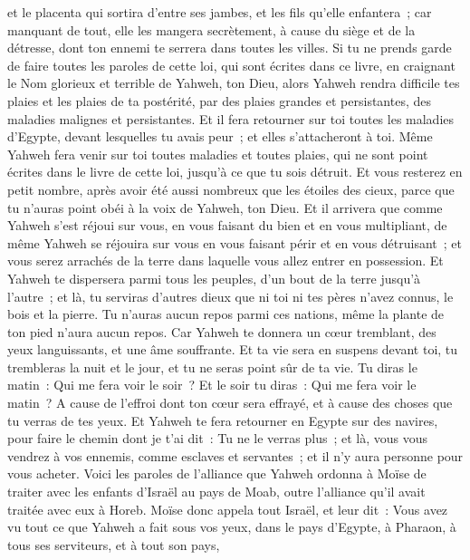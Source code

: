 \begin{multicols}{2}
et le placenta qui sortira d'entre ses jambes, et les fils qu'elle enfantera~; car manquant de tout, elle les mangera secrètement, à cause du siège et de la détresse, dont ton ennemi te serrera dans toutes les villes.
Si tu ne prends garde de faire toutes les paroles de cette loi, qui sont écrites dans ce livre, en craignant le Nom glorieux et terrible de Yahweh, ton Dieu,
alors Yahweh rendra difficile tes plaies et les plaies de ta postérité, par des plaies grandes et persistantes, des maladies malignes et persistantes. 
Et il fera retourner sur toi toutes les maladies d'Egypte, devant lesquelles tu avais peur~; et elles s'attacheront à toi.
Même Yahweh fera venir sur toi toutes maladies et toutes plaies, qui ne sont point écrites dans le livre de cette loi, jusqu'à ce que tu sois détruit.
Et vous resterez en petit nombre, après avoir été aussi nombreux que les étoiles des cieux, parce que tu n'auras point obéi à la voix de Yahweh, ton Dieu.
Et il arrivera que comme Yahweh s'est réjoui sur vous, en vous faisant du bien et en vous multipliant, de même Yahweh se réjouira sur vous en vous faisant périr et en vous détruisant~; et vous serez arrachés de la terre dans laquelle vous allez entrer en possession.
Et Yahweh te dispersera parmi tous les peuples, d'un bout de la terre jusqu'à l'autre~; et là, tu serviras d'autres dieux que ni toi ni tes pères n'avez connus, le bois et la pierre.
Tu n'auras aucun repos parmi ces nations, même la plante de ton pied n'aura aucun repos. Car Yahweh te donnera un cœur tremblant, des yeux languissants, et une âme souffrante.
Et ta vie sera en suspens devant toi, tu trembleras la nuit et le jour, et tu ne seras point sûr de ta vie.
Tu diras le matin~: Qui me fera voir le soir~? Et le soir tu diras~: Qui me fera voir le matin~? A cause de l'effroi dont ton cœur sera effrayé, et à cause des choses que tu verras de tes yeux.
Et Yahweh te fera retourner en Egypte sur des navires, pour faire le chemin dont je t'ai dit~: Tu ne le verras plus~; et là, vous vous vendrez à vos ennemis, comme esclaves et servantes~; et il n'y aura personne pour vous acheter.
\VerseOne{}Voici les paroles de l'alliance que Yahweh ordonna à Moïse de traiter avec les enfants d'Israël au pays de Moab, outre l'alliance qu'il avait traitée avec eux à Horeb.
Moïse donc appela tout Israël, et leur dit~: Vous avez vu tout ce que Yahweh a fait sous vos yeux, dans le pays d'Egypte, à Pharaon, à tous ses serviteurs, et à tout son pays,

\end{multicols}
